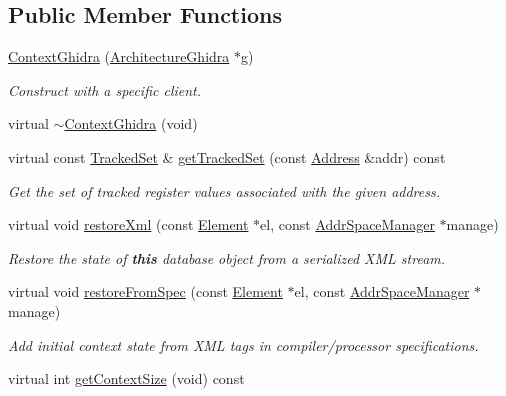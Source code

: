\subsection*{Public Member Functions}
\begin{DoxyCompactItemize}
\item 
\mbox{\hyperlink{class_context_ghidra_aa6ec9c1a7ef11712b1a1d8386dd84eba}{Context\+Ghidra}} (\mbox{\hyperlink{class_architecture_ghidra}{Architecture\+Ghidra}} $\ast$g)
\begin{DoxyCompactList}\small\item\em Construct with a specific client. \end{DoxyCompactList}\item 
virtual \mbox{\hyperlink{class_context_ghidra_abfd9482fa03d4b26dc0446ac531e1e43}{$\sim$\+Context\+Ghidra}} (void)
\item 
virtual const \mbox{\hyperlink{globalcontext_8hh_a7559d2c55c5d12fbbaf0418733b62438}{Tracked\+Set}} \& \mbox{\hyperlink{class_context_ghidra_a4f6d11b1a9dd101791a11ee522139828}{get\+Tracked\+Set}} (const \mbox{\hyperlink{class_address}{Address}} \&addr) const
\begin{DoxyCompactList}\small\item\em Get the set of tracked register values associated with the given address. \end{DoxyCompactList}\item 
virtual void \mbox{\hyperlink{class_context_ghidra_a8632d7b9354c57464dbe0a362d564bde}{restore\+Xml}} (const \mbox{\hyperlink{class_element}{Element}} $\ast$el, const \mbox{\hyperlink{class_addr_space_manager}{Addr\+Space\+Manager}} $\ast$manage)
\begin{DoxyCompactList}\small\item\em Restore the state of {\bfseries{this}} database object from a serialized X\+ML stream. \end{DoxyCompactList}\item 
virtual void \mbox{\hyperlink{class_context_ghidra_a7c35c56015e08545ff22473955ba7363}{restore\+From\+Spec}} (const \mbox{\hyperlink{class_element}{Element}} $\ast$el, const \mbox{\hyperlink{class_addr_space_manager}{Addr\+Space\+Manager}} $\ast$manage)
\begin{DoxyCompactList}\small\item\em Add initial context state from X\+ML tags in compiler/processor specifications. \end{DoxyCompactList}\item 
virtual int \mbox{\hyperlink{class_context_ghidra_a7baaa83e4b1b3cf9f6b3e5f467ed59c4}{get\+Context\+Size}} (void) const

\end{DoxyCompactItemize}
